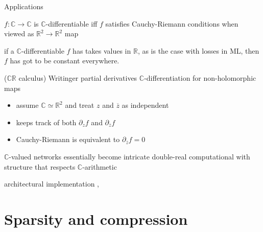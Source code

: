 \documentclass{beamer}
\newcommand{\real}{\mathbb{R}}
\newcommand{\cplx}{\mathbb{C}}
\newcommand{\conj}[1]{\overline{#1}}
\begin{document}
\begin{frame}[c]{Applications}{\insertsection}

\end{frame}

\begin{frame}[t]{\insertsection}

  $f\colon \cplx\to \cplx$ is $\cplx$-differentiable iff $f$ satisfies
  Cauchy-Riemann conditions when viewed as $\real^2 \to \real^2$ map

  if a $\cplx$-differentiable $f$ has takes values in $\real$, as is the
  case with losses in ML, then $f$ has got to be constant everywhere.

  ($\cplx\real$ calculus) Writinger partial derivatives $\cplx$-differentiation for non-holomorphic maps
  \begin{itemize}
    \item assume $\cplx\simeq \real^2$ and treat $z$ and $\conj{z}$ as independent
    \item keeps track of both $
      \partial_z f
    $ and $
      \partial_{\conj{z}} f
    $
    \item Cauchy-Riemann is equivalent to $\partial_{\conj{z}} f = 0$
  \end{itemize}


  $\cplx$-valued networks essentially become intricate double-real computational
  with structure that respects $\cplx$-arithmetic

  architectural implementation \cite{trabelsi_deep_2018}, \cite{arjovsky_unitary_2016}
\end{frame}



\section{Sparsity and compression} %
\label{sec:compression}
\end{document}
